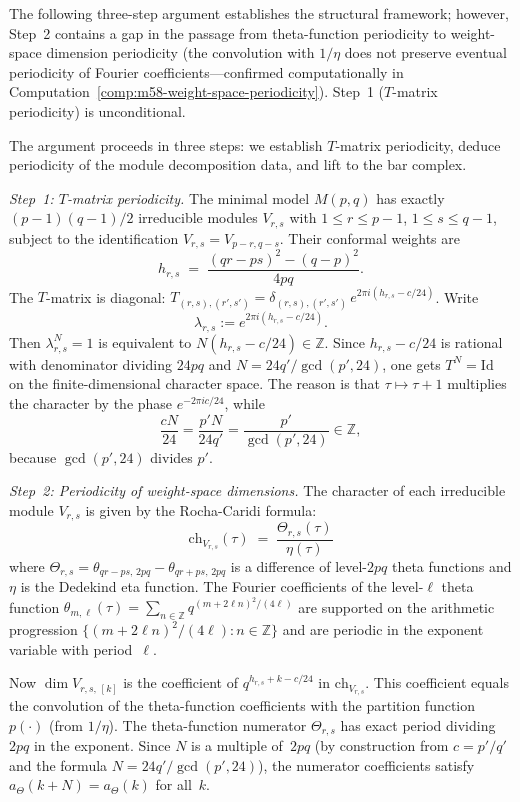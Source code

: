 \begin{evidence}
The following three-step argument establishes the structural
framework; however, Step~2 contains a gap in the passage from
theta-function periodicity to weight-space dimension periodicity
(the convolution with $1/\eta$ does not preserve eventual
periodicity of Fourier coefficients---confirmed computationally
in Computation~\ref{comp:m58-weight-space-periodicity}).
Step~1 ($T$-matrix periodicity) is unconditional.

\smallskip\noindent
The argument proceeds in three steps: we establish $T$-matrix periodicity, deduce
periodicity of the module decomposition data, and lift to the bar complex.

\emph{Step~1: $T$-matrix periodicity.}
The minimal model $M(p,q)$ has exactly $(p-1)(q-1)/2$ irreducible modules
$V_{r,s}$ with $1 \leq r \leq p-1$, $1 \leq s \leq q-1$, subject to the
identification $V_{r,s} = V_{p-r,q-s}$.  Their conformal weights are
\[
h_{r,s} \;=\; \frac{(qr - ps)^2 - (q-p)^2}{4pq}.
\]
The $T$-matrix is diagonal: $T_{(r,s),(r',s')} = \delta_{(r,s),(r',s')}
\, e^{2\pi i(h_{r,s} - c/24)}$.  Write
\[
\lambda_{r,s} := e^{2\pi i(h_{r,s} - c/24)}.
\]
Then $\lambda_{r,s}^N = 1$ is equivalent to
$N(h_{r,s} - c/24) \in \mathbb{Z}$.  Since $h_{r,s} - c/24$ is rational
with denominator dividing $24pq$ and
$N = 24q'/\gcd(p',24)$, one gets $T^N = \mathrm{Id}$ on the
finite-dimensional character space.  The reason is that
$\tau \mapsto \tau + 1$ multiplies the character by the phase
$e^{-2\pi i c/24}$, while
\[
\frac{cN}{24} = \frac{p'N}{24q'} = \frac{p'}{\gcd(p',24)} \in \mathbb{Z},
\]
because $\gcd(p',24)$ divides $p'$.

\emph{Step~2: Periodicity of weight-space dimensions.}
The character of each irreducible module $V_{r,s}$ is given by the
Rocha-Caridi formula:
\[
\mathrm{ch}_{V_{r,s}}(\tau) \;=\; \frac{\Theta_{r,s}(\tau)}{\eta(\tau)}
\]
where $\Theta_{r,s} = \theta_{qr-ps,\,2pq} - \theta_{qr+ps,\,2pq}$ is a
difference of level-$2pq$ theta functions and $\eta$ is the Dedekind eta
function.  The Fourier coefficients of the level-$\ell$ theta function
$\theta_{m,\ell}(\tau) = \sum_{n \in \mathbb{Z}} q^{(m + 2\ell n)^2/(4\ell)}$
are supported on the arithmetic progression $\{(m + 2\ell n)^2/(4\ell) : n \in \mathbb{Z}\}$
and are periodic in the exponent variable with period~$\ell$.

Now $\dim V_{r,s,\,[k]}$ is the coefficient of $q^{h_{r,s} + k - c/24}$ in
$\mathrm{ch}_{V_{r,s}}$.  This coefficient equals the convolution of the
theta-function coefficients with the partition function $p(\cdot)$
(from $1/\eta$).  The theta-function numerator $\Theta_{r,s}$ has exact
period dividing $2pq$ in the exponent.  Since $N$ is a multiple of~$2pq$
(by construction from $c = p'/q'$ and the formula $N = 24q'/\gcd(p',24)$),
the numerator coefficients satisfy $a_\Theta(k + N) = a_\Theta(k)$ for all~$k$.


\end{evidence}
